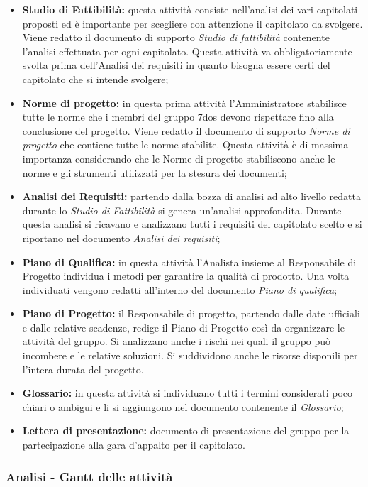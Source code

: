 \begin{itemize}

	\item \textbf{Studio di Fattibilità:} questa attività consiste nell'analisi dei vari capitolati proposti ed è importante per scegliere con attenzione il capitolato da svolgere. Viene redatto il documento di supporto \textit{Studio di fattibilità} contenente l'analisi effettuata per ogni capitolato. Questa attività va obbligatoriamente svolta prima dell'Analisi dei requisiti in quanto bisogna essere certi del capitolato che si intende svolgere;

	\item \textbf{Norme di progetto:} in questa prima attività l'Amministratore stabilisce tutte le norme che i membri del gruppo 7dos devono rispettare fino alla conclusione del progetto. Viene redatto il documento di supporto \textit{Norme di progetto} che contiene tutte le norme stabilite. Questa attività è di massima importanza considerando che le Norme di progetto stabiliscono anche le norme e gli strumenti utilizzati per la stesura dei documenti;

	\item \textbf{Analisi dei Requisiti:} partendo dalla bozza di analisi ad alto livello redatta durante lo \textit{Studio di Fattibilità} si genera un'analisi approfondita. Durante questa analisi si ricavano e analizzano tutti i requisiti del capitolato scelto e si riportano nel documento \textit{Analisi dei requisiti};

	\item \textbf{Piano di Qualifica:} in questa attività l'Analista insieme al Responsabile di Progetto individua i metodi per garantire la qualità di prodotto. Una volta individuati vengono redatti all'interno del documento \textit{Piano di qualifica};

	\item \textbf{Piano di Progetto:} il Responsabile di progetto, partendo dalle date ufficiali e dalle relative scadenze, redige il Piano di Progetto così da organizzare le attività del gruppo. Si analizzano anche i rischi nei quali il gruppo può incombere e le relative soluzioni. Si suddividono anche le risorse disponili per l'intera durata del progetto.

	\item \textbf{Glossario:} in questa attività si individuano tutti i termini considerati poco chiari o ambigui e li si aggiungono nel documento contenente il \textit{Glossario};
	
	\item \textbf{Lettera di presentazione:} documento di presentazione del gruppo per la partecipazione alla gara d'appalto per il capitolato.

\end{itemize}

\subsubsection{Analisi - Gantt delle attività}

\pagebreak
